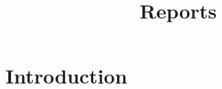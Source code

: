 \documentclass{article}
\begin{document}
\title{Reports}
\author{}
\date{}
\maketitle
\section{Introduction}
\end{document}
